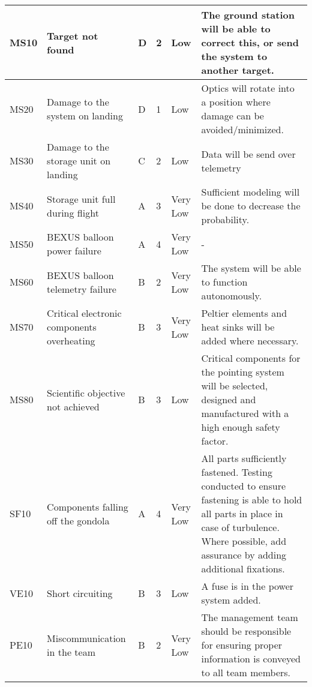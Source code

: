 \begin{longtable}{|m{}| m{} |m{} |m{}|m{}| m{}|}
MS10 & Target not found														& D & 2 & \cellcolor[HTML]{FCFF2F}Low			& The ground station will be able to correct this, or send the system to another target.\\\hline

MS20 & Damage to the system on landing										& D & 1 & \cellcolor[HTML]{FCFF2F}Low			& Optics will rotate into a position where damage can be avoided/minimized.\\\hline

MS30 & Damage to the storage unit on landing									& C & 2 & \cellcolor[HTML]{FCFF2F}Low			& Data will be send over telemetry\\\hline

MS40 & Storage unit full during flight											& A & 3 & \cellcolor[HTML]{34FF34}Very Low	& Sufficient modeling will be done to decrease the probability.\\\hline

MS50 & BEXUS balloon power failure											& A & 4 & \cellcolor[HTML]{34FF34}Very Low	& -\\\hline

MS60 & BEXUS balloon telemetry failure										& B & 2 & \cellcolor[HTML]{34FF34}Very Low	& The system will be able to function autonomously.\\\hline

MS70 & Critical electronic components overheating & B & 3 & \cellcolor[HTML]{34FF34}Very Low & Peltier elements and heat sinks will be added where necessary. \\\hline

MS80 & Scientific objective not achieved & B & 3 & \cellcolor[HTML]{FCFF2F} Low & Critical components for the pointing system will be selected, designed and manufactured with a high enough safety factor.\\\hline

SF10 & Components falling off the gondola									& A & 4 & \cellcolor[HTML]{34FF34}Very Low	& All parts sufficiently fastened. Testing conducted to ensure fastening is able to hold all parts in place in case of turbulence. Where possible, add assurance by adding additional fixations.\\\hline

VE10 & Short circuiting														& B & 3 & \cellcolor[HTML]{FCFF2F}Low			& A fuse is in the power system added.\\\hline

PE10 & Miscommunication in the team											& B & 2 & \cellcolor[HTML]{34FF34}Very Low	& The management team should be responsible for ensuring proper information is conveyed to all team members.\\\hline


\end{longtable}
